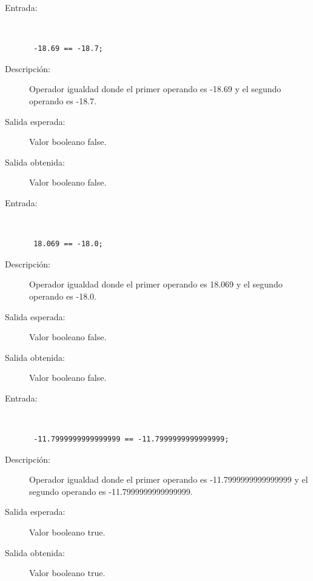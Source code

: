 \begin{framed}
	\begin{description}
		\item [Entrada:] \hfill \\
\begin{lstlisting}
 -18.69 == -18.7;
\end{lstlisting}
		\item [Descripción:] Operador igualdad donde el primer operando es -18.69 y el segundo operando es  -18.7.
		\item [Salida esperada:] Valor booleano false.
		\item [Salida obtenida:] Valor booleano false.
	\end{description}
\end{framed}

\begin{framed}
	\begin{description}
		\item [Entrada:] \hfill \\
\begin{lstlisting}
 18.069 == -18.0;
\end{lstlisting}
		\item [Descripción:] Operador igualdad donde el primer operando es 18.069 y el segundo operando es  -18.0.
		\item [Salida esperada:] Valor booleano false.
		\item [Salida obtenida:] Valor booleano false.
	\end{description}
\end{framed}

\begin{framed}
	\begin{description}
		\item [Entrada:] \hfill \\
\begin{lstlisting}
 -11.7999999999999999 == -11.7999999999999999;
\end{lstlisting}
		\item [Descripción:] Operador igualdad donde el primer operando es -11.7999999999999999 y el segundo operando es  -11.7999999999999999.
		\item [Salida esperada:] Valor booleano true.
		\item [Salida obtenida:] Valor booleano true.
	\end{description}
\end{framed}

